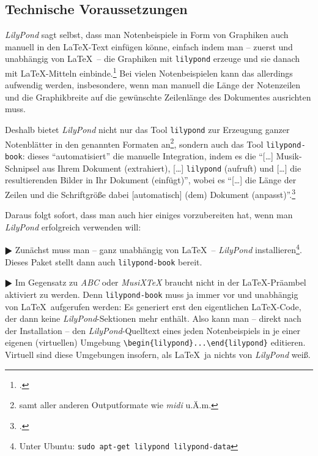 \subsection{Technische Voraussetzungen}

\textit{LilyPond} sagt selbst, dass man Notenbeispiele in Form von Graphiken auch
manuell in den \LaTeX-Text einfügen könne, einfach indem man -- zuerst und
unabhängig von \LaTeX\ -- die Graphiken mit \texttt{lilypond} erzeuge und sie
danach mit \LaTeX-Mitteln einbinde.\footcite[vgl.][20]{LilyPond2018e} Bei vielen
Notenbeispielen kann das allerdings aufwendig werden, insbesondere, wenn man
manuell die Länge der Notenzeilen und die Graphikbreite auf die gewünschte
Zeilenlänge des Dokumentes ausrichten muss.

Deshalb bietet \textit{LilyPond} nicht nur das Tool \texttt{lilypond} zur
Erzeugung ganzer Notenblätter in den genannten Formaten an\footnote{samt aller
anderen Outputformate wie \textit{midi} u.Ä.m.}, sondern auch das Tool
\texttt{lilypond-book}: dieses \enquote{automatisiert} die manuelle Integration,
indem es die \enquote{[\ldots] Musik-Schnipsel aus Ihrem Dokument (extrahiert),
[\ldots] \texttt{lilypond} (aufruft) und [\ldots] die resultierenden Bilder in
Ihr Dokument (einfügt)}, wobei es \enquote{[\ldots] die Länge der Zeilen und die
Schriftgröße dabei [automatisch] (dem) Dokument
(anpasst)}.\footcite[vgl.][20]{LilyPond2018e}

Daraus folgt sofort, dass man auch hier einiges vorzubereiten hat, wenn man
\textit{LilyPond} erfolgreich verwenden will:

$\RHD$ Zunächst muss man -- ganz unabhängig von \LaTeX\ -- \textit{LilyPond}
installieren\footnote{Unter Ubuntu: \texttt{sudo apt-get lilypond
lilypond-data}}. Dieses Paket stellt dann auch \texttt{lilypond-book} bereit.
  
$\RHD$ Im Gegensatz zu \textit{ABC} oder \textit{MusiX\TeX} braucht
 nicht in der \LaTeX-Präambel aktiviert zu werden. Denn
\texttt{lilypond-book} muss ja immer vor und unabhängig von \LaTeX\
aufgerufen werden: Es generiert erst den eigentlichen \LaTeX-Code, der dann
keine \textit{LilyPond}-Sektionen mehr enthält. Also kann man -- direkt nach der
Installation -- den \textit{LilyPond}-Quelltext eines jeden Notenbeispiels in je
einer eigenen (virtuellen) Umgebung \verb|\begin{lilypond}...\end{lilypond}|
editieren. Virtuell sind diese Umgebungen insofern, als \LaTeX\ ja nichts von
\textit{LilyPond} weiß.

